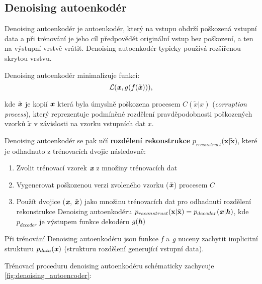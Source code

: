 \subsection{Denoising autoenkodér}
\label{sec:denoising_autoencoder}
Denoising autoenkodér je autoenkodér, který na vstupu obdrží poškozená vstupní data
a při trénování je jeho cíl předpovědět originální vstup bez poškození, a ten na výstupní vrstvě vrátit.
Denoising autoenkodér typicky používá rozšířenou skrytou vrstvu. \cite{Charte2018}

Denoising autoenkodér minimalizuje funkci:
\begin{equation}
    \mathcal{L}(\textbf{\emph{x}}, g(f(\tilde{\textbf{\emph{x}}}))),
\end{equation}

kde $\tilde{\textbf{\emph{x}}}$ je kopií $\textbf{\emph{x}}$ která byla úmyslně poškozena procesem $C(\tilde{x} | x)$ (\emph{corruption process}),
který reprezentuje podmíněné rozdělení pravděpodobnosti poškozených vzorků $\tilde{x}$ v závislosti na vzorku vstupních dat $x$. \cite{Goodfellow2016}

Denoising autoenkodér se pak učí \textbf{rozdělení rekonstrukce} $p_{reconstruct}$($\mathbf{x}|\mathbf{\tilde{x}}$),
které je odhadnuto z trénovacích dvojic následovně:

\begin{enumerate}
    \item Zvolit trénovací vzorek $\emph{\textbf{x}}$ z množiny trénovacích dat
    \item Vygenerovat poškozenou verzi zvoleného vzorku ($\tilde{\textbf{\emph{x}}}$) procesem $C$
    \item Použít dvojice ($\emph{\textbf{x}}$, $\tilde{\textbf{\emph{x}}}$) jako množinu trénovacích dat pro odhadnutí rozdělení rekonstrukce Denoising autoenkodéru $p_{reconstruct}(\textbf{x} | \tilde{\textbf{x}}) = p_{decoder}(\textbf{\emph{x}}|\textbf{\emph{h}})$, kde $p_{decoder}$ je výstupem funkce dekodéru $g(\textbf{\emph{h}})$
\end{enumerate}

Při trénování Denoising autoenkodéru jsou funkce $\emph{f}$ a $\emph{g}$ nuceny zachytit implicitní strukturu $p_{data}(\textbf{\emph{x}})$ (strukturu rozdělení generující vstupní data). \cite{Goodfellow2016}

Trénovací proceduru denoising autoenkodéru schématicky zachycuje \autoref{fig:denoising_autoencoder}:

